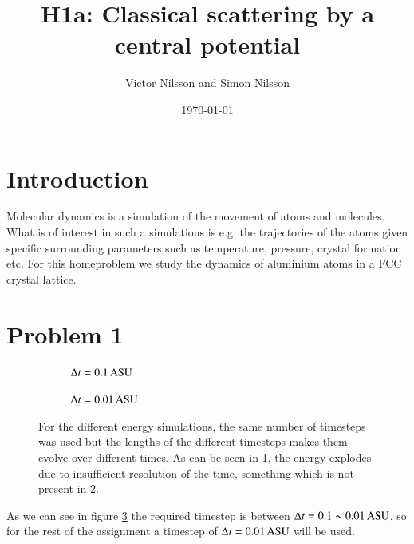 



\title{H1a: Classical scattering by a central potential}
\author{Victor Nilsson and Simon Nilsson}
\date{\today}





\section*{Introduction}

Molecular dynamics is a simulation of the movement of atoms and molecules. What is of interest in such a simulations is e.g. the trajectories of the atoms given specific surrounding parameters such as temperature, pressure, crystal formation etc. For this homeproblem we study the dynamics of aluminium atoms in a FCC crystal lattice.

\section*{Problem 1}

\begin{figure}[H]
    \centering
    \captionsetup[subfigure]{justification=centering}
    \begin{subfigure}[b]{0.40\textwidth}
        \centering
        \resizebox{\columnwidth}{!}{}
        \caption{$\Delta t =\unit[0.1]{ASU}$}
        \label{fig:timestep_a}
    \end{subfigure}
    \begin{subfigure}[b]{0.40\textwidth}
        \centering
        \resizebox{\columnwidth}{!}{}
        \caption{$\Delta t =\unit[0.01]{ASU}$}
        \label{fig:timestep_b}
    \end{subfigure}
    \caption{For the different energy simulations, the same number of timesteps was used but the lengths of the different timesteps makes them evolve over different times. As can be seen in \ref{fig:timestep_a}, the energy explodes due to insufficient resolution of the time, something which is not present in \ref{fig:timestep_b}.}
    \label{fig:timestep}
\end{figure}

As we can see in figure \ref{fig:timestep} the required timestep is between $\Delta t = 0.1 \sim \unit[0.01]{ASU}$, so for the rest of the assignment a timestep of $\Delta t = \unit[0.01]{ASU}$ will be used.


